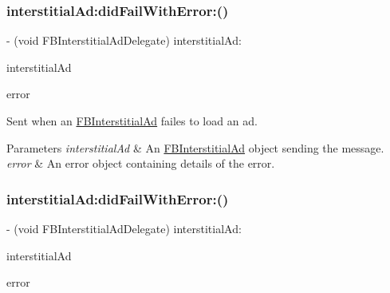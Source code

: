 \subsubsection{\texorpdfstring{interstitial\+Ad\+:did\+Fail\+With\+Error\+:()}{interstitialAd:didFailWithError:()}\hspace{0.1cm}{\footnotesize\ttfamily [1/5]}}
{\footnotesize\ttfamily -\/ (void F\+B\+Interstitial\+Ad\+Delegate) interstitial\+Ad\+: \begin{DoxyParamCaption}\item[{(\hyperlink{interfaceFBInterstitialAd}{F\+B\+Interstitial\+Ad} $\ast$)}]{interstitial\+Ad }\item[{didFailWithError:(N\+S\+Error $\ast$)}]{error }\end{DoxyParamCaption}\hspace{0.3cm}{\ttfamily [optional]}}

Sent when an \hyperlink{interfaceFBInterstitialAd}{F\+B\+Interstitial\+Ad} failes to load an ad.


\begin{DoxyParams}{Parameters}
{\em interstitial\+Ad} & An \hyperlink{interfaceFBInterstitialAd}{F\+B\+Interstitial\+Ad} object sending the message. \\
\hline
{\em error} & An error object containing details of the error. \\
\hline
\end{DoxyParams}
\mbox{\label{protocolFBInterstitialAdDelegate_01-p_a55d38d3ba346d2251fe10cec24023da7}} 
\subsubsection{\texorpdfstring{interstitial\+Ad\+:did\+Fail\+With\+Error\+:()}{interstitialAd:didFailWithError:()}\hspace{0.1cm}{\footnotesize\ttfamily [2/5]}}
{\footnotesize\ttfamily -\/ (void F\+B\+Interstitial\+Ad\+Delegate) interstitial\+Ad\+: \begin{DoxyParamCaption}\item[{(\hyperlink{interfaceFBInterstitialAd}{F\+B\+Interstitial\+Ad} $\ast$)}]{interstitial\+Ad }\item[{didFailWithError:(N\+S\+Error $\ast$)}]{error }\end{DoxyParamCaption}\hspace{0.3cm}{\ttfamily [optional]}}

